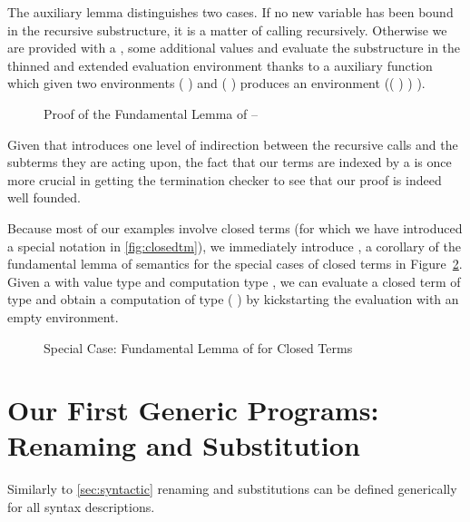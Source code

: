 The auxiliary lemma  distinguishes two cases. If no new variable has
been bound in the recursive substructure, it is a matter of calling 
recursively. Otherwise we are provided with a , some additional
values and evaluate the substructure in the thinned and extended evaluation
environment thanks to a auxiliary function \AF{\_>>\_} which given two
environments {( )  } and {( )  }
produces an environment {(( \AF{++} ) )  )}.

\begin{figure}[h]
\caption{Proof of the Fundamental Lemma of  -- \label{fig:genbody}}
\end{figure}

Given that  introduces one level of indirection between the recursive
calls and the subterms they are acting upon, the fact that our terms are indexed
by a  is once more crucial in getting the termination checker to see
that our proof is indeed well founded.

Because most of our examples involve closed terms (for which we have
introduced a special notation in \cref{fig:closedtm}), we immediately
introduce , a corollary of the fundamental lemma of semantics
for the special cases of closed terms in Figure~\ref{fig:closedsem}.
Given a  with value type  and computation type ,
we can evaluate a closed term of type  and obtain a computation of
type {(  \AIC{[]})} by kickstarting the evaluation with an
empty environment.

\begin{figure}[h]
\caption{Special Case: Fundamental Lemma of  for Closed Terms\label{fig:closedsem}}
\end{figure}

\section{Our First Generic Programs: Renaming and Substitution}\label{section:renandsub}

Similarly to \cref{sec:syntactic} renaming and substitutions can be defined generically
for all syntax descriptions.

